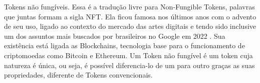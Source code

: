 Tokens não fungíveis. Essa é a tradução livre para Non-Fungible Tokens, palavras que juntas formam a sigla NFT. Ela ficou famosa nos últimos anos com o advento de seu uso, ligado ao contexto do mercado das artes digitais e tendo sido inclusive um dos assuntos mais buscados por brasileiros no Google em 2022 . Sua existência está ligada as Blockchains, tecnologia base para o funcionamento de criptomoedas como Bitcoin e Ethereum. Um Token não fungível é um token cuja natureza é única, ou seja, é possível diferencia-lo de um para outro graças as suas propriedades, diferente de Tokens convencionais. 



	

	
